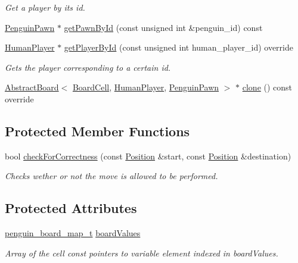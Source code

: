 \begin{DoxyCompactItemize}
\begin{DoxyCompactList}\small\item\em Get a player by it\textquotesingle{}s id. \end{DoxyCompactList}\item 
\hyperlink{classgame_1_1penguin_1_1_penguin_pawn}{Penguin\+Pawn} $\ast$ \hyperlink{classgame_1_1penguin_1_1_board_a169a4af29387bc09929e12af674adc62}{get\+Pawn\+By\+Id} (const unsigned int \&penguin\+\_\+id) const
\item 
\hyperlink{classgame_1_1penguin_1_1_human_player}{Human\+Player} $\ast$ \hyperlink{classgame_1_1penguin_1_1_board_a8728b4381bc2e007710d275bb226cf95}{get\+Player\+By\+Id} (const unsigned int human\+\_\+player\+\_\+id) override
\begin{DoxyCompactList}\small\item\em Gets the player corresponding to a certain id. \end{DoxyCompactList}\item 
\hyperlink{classgame_1_1_abstract_board}{Abstract\+Board}$<$ \hyperlink{classgame_1_1penguin_1_1_board_cell}{Board\+Cell}, \hyperlink{classgame_1_1penguin_1_1_human_player}{Human\+Player}, \hyperlink{classgame_1_1penguin_1_1_penguin_pawn}{Penguin\+Pawn} $>$ $\ast$ \hyperlink{classgame_1_1penguin_1_1_board_acad4a3c7bee2103aea4586356ceabb8e}{clone} () const override
\end{DoxyCompactItemize}
\subsection*{Protected Member Functions}
\begin{DoxyCompactItemize}
\item 
bool \hyperlink{classgame_1_1penguin_1_1_board_a2864b1af9dbdf19273185c504257435c}{check\+For\+Correctness} (const \hyperlink{structgame_1_1_position}{Position} \&start, const \hyperlink{structgame_1_1_position}{Position} \&destination)
\begin{DoxyCompactList}\small\item\em Checks wether or not the move is allowed to be performed. \end{DoxyCompactList}\end{DoxyCompactItemize}
\subsection*{Protected Attributes}
\begin{DoxyCompactItemize}
\item 
\hyperlink{namespacegame_1_1penguin_a6ea7c0fc4c04931bf39fcac439c92735}{penguin\+\_\+board\+\_\+map\+\_\+t} \hyperlink{classgame_1_1penguin_1_1_board_ab89d4ad0fcac9a4cb2ebebb3d0aa3eed}{board\+Values}
\begin{DoxyCompactList}\small\item\em Array of the cell const pointers to variable element indexed in board\+Values. \end{DoxyCompactList}\end{DoxyCompactItemize}


